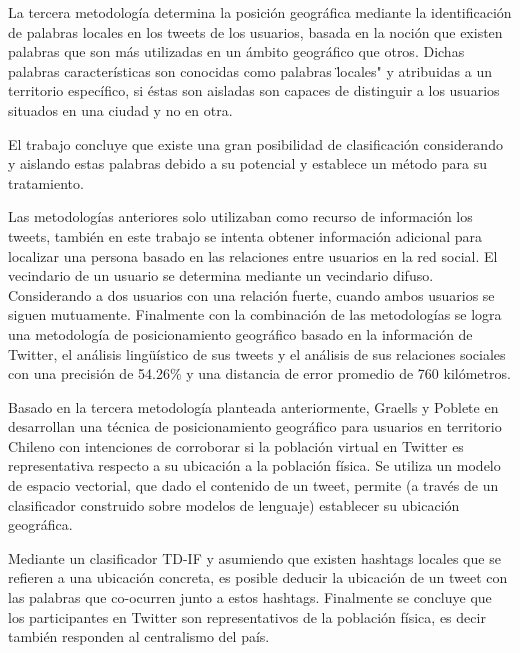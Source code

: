 La tercera metodología determina la posición geográfica mediante la identificación de palabras locales en los tweets de los usuarios, basada en la noción que existen palabras que son más utilizadas en un ámbito geográfico que otros. Dichas palabras características son conocidas como palabras  \"locales" y atribuidas a un territorio específico, si éstas son aisladas son capaces de distinguir a los usuarios situados en una ciudad y no en otra. 

El trabajo concluye que existe una gran posibilidad de clasificación considerando y aislando estas palabras debido a su potencial y establece un método para su tratamiento. 

Las metodologías anteriores solo utilizaban como recurso de información los tweets, también en este trabajo se intenta obtener información adicional para localizar una persona basado en las relaciones entre usuarios en la red social. El vecindario de un usuario se determina mediante un vecindario difuso. Considerando a dos usuarios con una relación fuerte, cuando ambos usuarios se siguen mutuamente. Finalmente con la combinación de las metodologías se logra una metodología de posicionamiento geográfico basado en la información de Twitter, el análisis lingüístico de sus tweets y el análisis de sus relaciones sociales con una precisión de 54.26\% y una distancia de error promedio de 760 kilómetros.

Basado en la tercera metodología planteada anteriormente,  Graells y Poblete en \cite{GraellsGarridoP13} desarrollan una técnica de posicionamiento geográfico para usuarios en territorio Chileno con intenciones de corroborar si la población virtual en Twitter es representativa respecto a su ubicación a la población física. Se utiliza un modelo de espacio vectorial, que dado el contenido de un tweet, permite (a través de un clasificador construido sobre modelos de lenguaje) establecer su ubicación geográfica. 

Mediante un clasificador TD-IF y asumiendo que existen hashtags locales que se refieren a una ubicación concreta, es posible deducir la ubicación de un tweet con las palabras que co-ocurren junto a estos hashtags. Finalmente se concluye que los participantes en Twitter son representativos de la población física, es decir también responden al centralismo del país.


